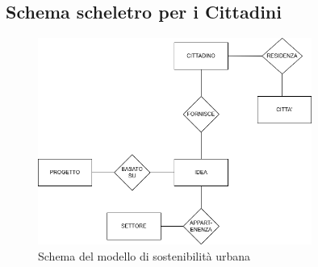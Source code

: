 \documentclass{article}
\begin{document}
\subsection*{Schema scheletro per i Cittadini}
\vspace{0.6cm}

\begin{figure}[H]
    \centering
    \includegraphics[width=0.8\textwidth]{images/SCHELETRO_CITTADINO.drawio.png}
    \caption{Schema del modello di sostenibilità urbana}
    \label{fig:schema-sostenibilita}
\end{figure}
\end{document}
